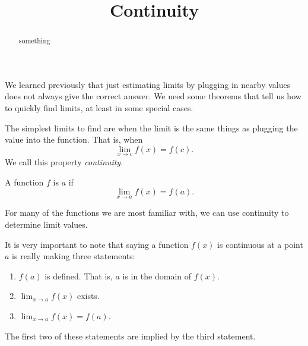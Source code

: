 \documentclass{ximera}
\title[Dig-In:]{Continuity}
\begin{document}
\begin{abstract}
  something
\end{abstract}
\maketitle


We learned previously that just estimating limits by plugging in nearby values
does not always give the correct answer.  We need some theorems that
tell us how to quickly find limits, at least in some special cases.  

The simplest limits to find are when the limit is the same things as plugging the value into the function. That is, when
\[
\lim_{x\to c}f(x) = f(c).
\]
We call this property \textit{continuity}.

\begin{definition}
  A function $f$ is  $a$ if
  \[
  \lim_{x\to a}f(x) = f(a).
  \]
\end{definition}

For many of the functions we are most familiar with, we can use continuity to determine limit values.  

It is very important to note that saying a function $f(x)$ is continuous at a point
$a$ is really making three statements:
\begin{enumerate}
\item $f(a)$ is defined.  That is, $a$ is in the domain of $f(x)$.
\item $\lim_{x\to a}f(x)$ exists.
\item $\lim_{x\to a} f(x) = f(a)$.
\end{enumerate}

The first two of these statements are implied by the third statement.
\end{document}
